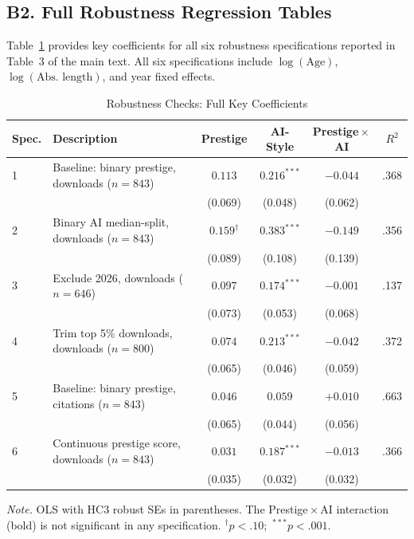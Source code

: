 \documentclass[12pt,a4paper]{article}
\begin{document}
\subsection*{B2. Full Robustness Regression Tables}

Table~\ref{tab:b2_robust} provides key coefficients for all six
robustness specifications reported in Table~3 of the main text.
All six specifications include $\log(\text{Age})$,
$\log(\text{Abs.\ length})$, and year fixed effects.

\begin{table}[htbp]
\centering
\caption{Robustness Checks: Full Key Coefficients}
\label{tab:b2_robust}
\begin{threeparttable}
\small
\setlength{\tabcolsep}{5pt}
\begin{tabular}{lp{3.5cm}cccc}
\toprule
Spec. & Description & Prestige & AI-Style & \textbf{Prestige\,$\times$\,AI} & $R^2$ \\
\midrule
1 & Baseline: binary prestige, downloads ($n=843$)
  & $0.113$ & $0.216^{***}$ & $\mathbf{-0.044}$ & .368 \\
  & & (0.069) & (0.048) & (0.062) & \\[3pt]
2 & Binary AI median-split, downloads ($n=843$)
  & $0.159^{\dagger}$ & $0.383^{***}$ & $\mathbf{-0.149}$ & .356 \\
  & & (0.089) & (0.108) & (0.139) & \\[3pt]
3 & Exclude 2026, downloads ($n=646$)
  & $0.097$ & $0.174^{***}$ & $\mathbf{-0.001}$ & .137 \\
  & & (0.073) & (0.053) & (0.068) & \\[3pt]
4 & Trim top 5\% downloads, downloads ($n=800$)
  & $0.074$ & $0.213^{***}$ & $\mathbf{-0.042}$ & .372 \\
  & & (0.065) & (0.046) & (0.059) & \\[3pt]
5 & Baseline: binary prestige, citations ($n=843$)
  & $0.046$ & $0.059$ & $\mathbf{+0.010}$ & .663 \\
  & & (0.065) & (0.044) & (0.056) & \\[3pt]
6 & Continuous prestige score, downloads ($n=843$)
  & $0.031$ & $0.187^{***}$ & $\mathbf{-0.013}$ & .366 \\
  & & (0.035) & (0.032) & (0.032) & \\[3pt]
\bottomrule
\end{tabular}
\begin{tablenotes}
\footnotesize
\item \textit{Note.} OLS with HC3 robust SEs in parentheses.
  The Prestige\,$\times$\,AI interaction (bold) is not significant
  in any specification.
  $^{\dagger}p<.10$;\ $^{***}p<.001$.
\end{tablenotes}
\end{threeparttable}
\end{table}
\end{document}
